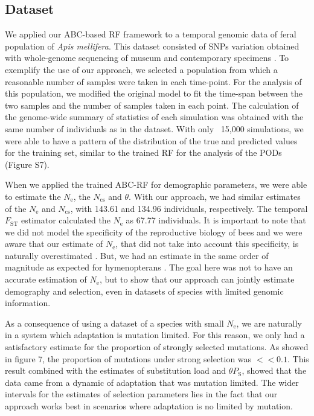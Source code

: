 \documentclass[a4paper, 12pt]{article}
\begin{document}
\subsection*{Dataset}

We applied our ABC-based RF framework to a temporal genomic data of feral population of \textit{Apis mellifera}. This dataset consisted of SNPs variation obtained with whole-genome sequencing of museum and contemporary specimens \citep{Cridland:2018fx}. To exemplify the use of our approach, we selected a population from which a reasonable number of samples were taken in each time-point. For the analysis of this population, we modified the original model to fit the time-span between the two samples and the number of samples taken in each point. The calculation of the genome-wide summary of statistics of each simulation was obtained with the same number of individuals as in the dataset. With only  ~15,000 simulations, we were able to have a pattern of the distribution of the true and predicted values for the training set, similar to the trained RF for the analysis of the PODs (Figure S7). 

When we applied the trained ABC-RF for demographic parameters, we were able to estimate the $N_{\mathrm{e}}$, the $N_{\mathrm{cs}}$ and $\theta$. With our approach, we had similar estimates of the $N_{\mathrm{e}}$ and $N_{\mathrm{cs}}$, with 143.61 and 134.96 individuals, respectively. The temporal $F_{\mathrm{ST}}$ estimator calculated the $N_{\mathrm{e}}$ as 67.77 individuals. It is important to note that we did not model the specificity of the reproductive biology of bees and we were aware that our estimate of $N_{\mathrm{e}}$, that did not take into account this specificity, is naturally overestimated \citep{Nomura:2012bp}. But, we had an estimate in the same order of magnitude as expected for hymenopterans \citep{Zayed:2004kg}. The goal here was not to have an accurate estimation of $N_{\mathrm{e}}$, but to show that our approach can jointly estimate demography and selection, even in datasets of species with limited genomic information.

As a consequence of using a dataset of a species with small $N_{\mathrm{e}}$, we are naturally in a system which adaptation is mutation limited. For this reason, we only had a satisfactory estimate for the proportion of strongly selected mutations. As showed in figure 7, the proportion of mutations under strong selection was $<< 0.1$. This result combined with the estimates of substitution load and $\theta P_{\mathrm{S}}$, showed that the data came from a dynamic of adaptation that was mutation limited. The wider intervals for the estimates of selection parameters lies in the fact that our approach works best in scenarios where adaptation is no limited by mutation. 
\end{document}
